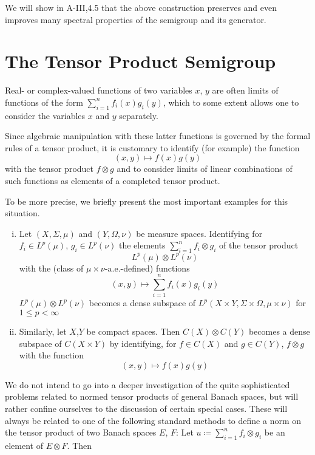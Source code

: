 We will show in A-III,4.5 that the above construction preserves and even improves many spectral properties of the semigroup and its generator.

\section{The Tensor Product Semigroup}\label{sec:a1-3.7}

Real- or complex-valued functions of two variables $x$, $y$ are often limits of functions of the form $\sum_{i=1}^{n} f_{i}(x)g_{i}(y)$, which to some extent allows one to consider the variables $x$ and $y$ separately.


Since algebraic manipulation with these latter functions is governed by the formal rules of a tensor product, it is customary to identify (for example) the function
\[
    (x,y) \mapsto f(x)g(y)
\]
with the tensor product $f \otimes g$ and to consider limits of linear combinations of such functions as elements of a completed tensor product.

To be more precise, we briefly present the most important examples for this situation.

\begin{examples}\label{ex:a1-3.7}
\begin{enumerate}[(i), wide]
\item
Let $(X,\Sigma,\mu)$ and $(Y,\Omega,\nu)$ be measure spaces. 
Identifying for $f_{i} \in L^{p}(\mu)$, $g_{i} \in L^{p}(\nu)$ the elements $\sum_{i=1}^{n} f_{i} \otimes g_{i}$ of the tensor product
\[
    L^{p}(\mu) \otimes L^{p}(\nu)
\]
with the (class of $\mu \times \nu$-a.e.-defined) functions
\[
    (x,y) \mapsto \sum_{i=1}^{n} f_{i}(x)g_{i}(y)
\]
$L^{p}(\mu) \otimes L^{p}(\nu)$ becomes a dense subspace of $L^{p}(X\times Y,\Sigma\times\Omega,\mu\times\nu)$ for $1 \leq p < \infty$

\item
Similarly, let $X$,$Y$ be compact spaces. Then $C(X) \otimes C(Y)$ becomes a dense subspace of $C(X\times Y)$ by identifying, for $f \in C(X)$ and $g \in C(Y)$, $f \otimes g$ with the function
\[
    (x,y) \mapsto f(x)g(y)
\]
\end{enumerate}
\end{examples}
We do not intend to go into a deeper investigation of the quite sophisticated problems related to normed tensor products of general Banach spaces, but will rather confine ourselves to the discussion of certain special cases.
These will always be related to one of the following standard methods to define a norm on the tensor product of two Banach spaces $E$, $F$:
Let $u \coloneqq \sum_{i=1}^{n} f_{i} \otimes g_{i}$ be an element of $E \otimes F$. 
Then

